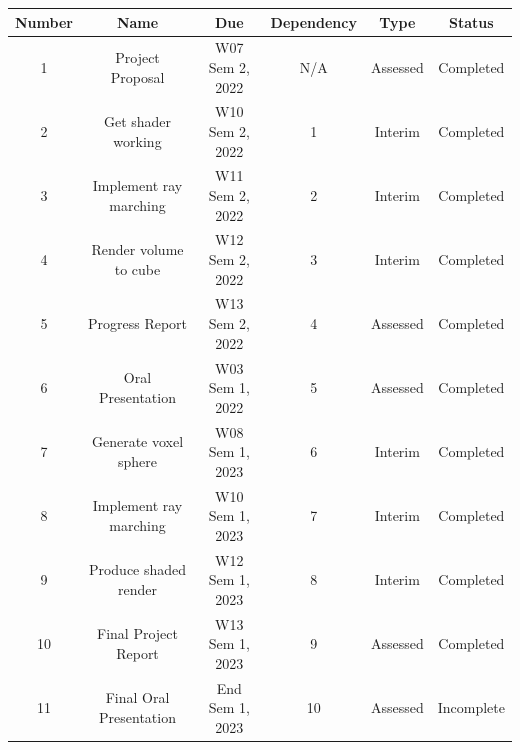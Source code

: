 \documentclass[titlepage]{article}
\begin{document}
\begin{center}
  \begin{tabular}{|c|c|c|c|c|c|}
    \hline
    Number & Name                    & Due             & Dependency & Type     & Status     \\
    \hline
    1      & Project Proposal        & W07 Sem 2, 2022 & N/A        & Assessed & Completed  \\
    2      & Get shader working      & W10 Sem 2, 2022 & 1          & Interim  & Completed  \\
    3      & Implement ray marching  & W11 Sem 2, 2022 & 2          & Interim  & Completed  \\
    4      & Render volume to cube   & W12 Sem 2, 2022 & 3          & Interim  & Completed  \\
    5      & Progress Report         & W13 Sem 2, 2022 & 4          & Assessed & Completed  \\
    6      & Oral Presentation       & W03 Sem 1, 2022 & 5          & Assessed & Completed  \\
    7      & Generate voxel sphere   & W08 Sem 1, 2023 & 6          & Interim  & Completed  \\
    8      & Implement ray marching  & W10 Sem 1, 2023 & 7          & Interim  & Completed  \\
    9      & Produce shaded render   & W12 Sem 1, 2023 & 8          & Interim  & Completed  \\
    10     & Final Project Report    & W13 Sem 1, 2023 & 9          & Assessed & Completed  \\
    11     & Final Oral Presentation & End Sem 1, 2023 & 10         & Assessed & Incomplete \\
    \hline
  \end{tabular}
\end{center}


\end{document}

